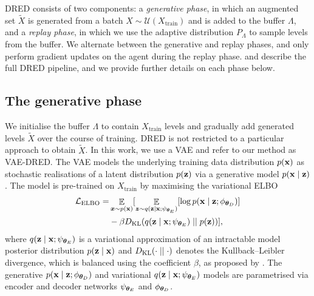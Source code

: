\documentclass{article}
\theoremstyle{plain}
\theoremstyle{definition}
\theoremstyle{remark}
\begin{document}

DRED consists of two components: a \textit{generative phase}, in which an augmented set $\tilde{X}$ is generated from a batch $X \sim \mathcal{U}(X_\text{train})$ and is added to the buffer $\Lambda$, and a \textit{replay phase}, in which we use the adaptive distribution $P_\Lambda$ to sample levels from the buffer. We alternate between the generative and replay phases, and only perform gradient updates on the agent during the replay phase.  and  describe the full DRED pipeline, and we provide further details on each phase below.
\subsection{The generative phase}
We initialise the buffer $\Lambda$ to contain $X_\text{train}$ levels and gradually add generated levels $\tilde{X}$ over the course of training. DRED is not restricted to a particular approach to obtain $\tilde{X}$. In this work, we use a VAE \citep{VAE, VAE-pmlr-v32-rezende14} and refer to our method as VAE-DRED. The VAE models the underlying training data distribution $p({\mathbf{x}})$ %
as stochastic realisations of a latent distribution $p({\mathbf{z}})$ via a generative model $p({\mathbf{x}} \mid {\mathbf{z}})$.
The model is pre-trained on $X_\text{train}$ by maximising the variational ELBO
\begin{equation} \label{eq:ELBO}
\begin{split}
    \mathcal{L}_{\text{ELBO}} = & \mathop{\mathbb{E}}_{{\bm{x}}\sim p({\mathbf{x}})} [  \mathop{\mathbb{E}}_{{\bm{z}} \sim q({\mathbf{z}}|{\mathbf{x}}; \psi_{{\bm{\theta}}_E})}[\log p({\mathbf{x}} \mid {\mathbf{z}}; \phi_{{\bm{\theta}}_D})] \\
    & - \beta D_{\mathrm{KL}}(q({\mathbf{z}} \mid {\mathbf{x}};\psi_{{\bm{\theta}}_E})\mid\mid p({\mathbf{z}}))],
\end{split}
\end{equation}
where $q({\mathbf{z}} \mid {\mathbf{x}}; \psi_{{\bm{\theta}}_E})$ is a variational approximation of an intractable model posterior distribution $p({\mathbf{z}} \mid {\mathbf{x}})$ and $D_{\mathrm{KL}}(\cdot \mid\mid \cdot)$ denotes the Kullback--Leibler divergence, which is balanced using the coefficient $\beta$, as proposed by \citet{betaVAE}. 
The generative $p({\mathbf{x}} \mid {\mathbf{z}}; \phi_{{\bm{\theta}}_D})$ and variational $q({\mathbf{z}} \mid {\mathbf{x}} ; \psi_{{\bm{\theta}}_E})$ models are parametrised via encoder and decoder networks $\psi_{{\bm{\theta}}_E}$ and $\phi_{{\bm{\theta}}_D}$.%
\end{document}
